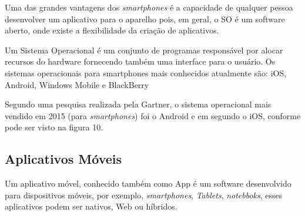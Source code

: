 Uma das grandes vantagens dos \textit{smartphones} é a capacidade de qualquer pessoa desenvolver um aplicativo para o aparelho pois, em geral, o SO é um software aberto, onde existe a flexibilidade da criação de aplicativos.

Um Sistema Operacional é um conjunto de programas responsável por alocar recursos do hardware fornecendo também uma interface para o usuário. Os sistemas operacionais para smartphones mais conhecidos atualmente são: iOS, Android, Windows Mobile e BlackBerry \cite{oqsmar}

Segundo uma pesquisa realizada pela Gartner, o sistema operacional mais vendido em 2015 (para \textit{smartphones}) foi o Android e em segundo o iOS, conforme pode ser visto na figura 10. \cite{gar}
\begin{figure}[h!]
		\centering
	\end{figure}

\subsection{Aplicativos Móveis}
Um aplicativo móvel, conhecido também como App é um software desenvolvido para dispositivos móveis, por exemplo, \textit{smartphones},  \textit{Tablets}, \textit{notebboks}, esses aplicativos podem ser nativos, Web ou híbridos. \cite{dif}

